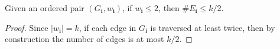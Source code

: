\begin{lemma}
  \label{lem:}
  \uses{}
  Given an ordered pair $(G_\mathbf{i},w_\mathbf{i})$, if $w_\mathbf{i} \leq 2$, then $\# E_\mathbf{i} \leq k/2$.
\end{lemma}
\begin{proof}
  Since $|w_\mathbf{i}| = k$, if each edge in $G_\mathbf{i}$ is traversed at least twice, then by construction the number of edges is at most $k/2$.
\end{proof}


\iffalse














\fi
